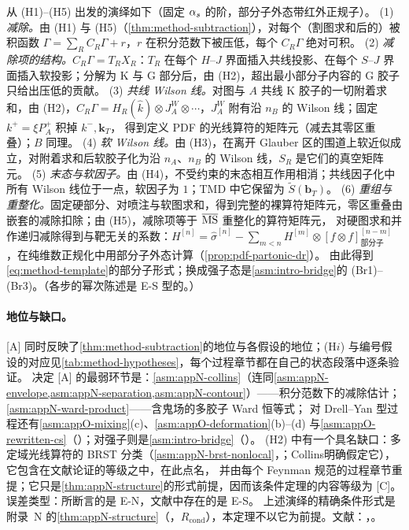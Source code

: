 \begin{proofsketch}
从 (H1)--(H5) 出发的演绎如下（固定 $\alpha_s$ 的阶，部分子外态带红外正规子）。
(1) \emph{减除。}由 (H1) 与 (H5)（\cref{thm:method-subtraction}），对每个（割图求和后的）被积函数 $\Gamma=\sum_RC_R\Gamma+r$，$r$ 在积分范数下被压低，每个 $C_R\Gamma$ 绝对可积。
(2) \emph{减除项的结构。}$C_R\Gamma=T_RX_R$：$T_R$ 在每个 $H$--$J$ 界面插入共线投影、在每个 $S$--$J$ 界面插入软投影；分解为 K 与 G 部分后，由 (H2)，超出最小部分子内容的 G 胶子只给出压低的贡献。
(3) \emph{共线 Wilson 线。}对图与 $A$ 共线 K 胶子的一切附着求和，由 (H2)，$C_R\Gamma=H_R(\hat k)\otimes J_A^W\otimes\cdots$，$J_A^W$ 附有沿 $n_B$ 的 Wilson 线；固定 $k^+=\xi P_A^+$ 积掉 $k^-,\mathbf k_T$，
得到定义 PDF 的光线算符的矩阵元（减去其零区重叠）；$B$ 同理。
(4) \emph{软 Wilson 线。}由 (H3)，在离开 Glauber 区的围道上软近似成立，对附着求和后软胶子化为沿 $n_A$、$n_B$ 的 Wilson 线，$S_R$ 是它们的真空矩阵元。
(5) \emph{末态与软因子。}由 (H4)，不受约束的末态相互作用相消；共线因子化中所有 Wilson 线位于一点，软因子为 $1$；TMD 中它保留为 $\tilde S(\mathbf b_T)$。
(6) \emph{重组与重整化。}固定硬部分、对喷注与软图求和，得到完整的裸算符矩阵元，零区重叠由嵌套的减除扣除；由 (H5)，减除项等于 $\overline{\rm MS}$ 重整化的算符矩阵元，
对硬图求和并作递归减除得到与靶无关的系数：$H^{[n]}=\hat\sigma^{[n]}-\sum_{m<n}H^{[m]}\otimes[f\otimes f]^{[n-m]}_{\text{部分子}}$，在纯维数正规化中用部分子外态计算（\cref{prop:pdf-partonic-dr}）。
由此得到\cref{eq:method-template}的部分子形式；换成强子态是\cref{asm:intro-bridge}的 (Br1)--(Br3)。（各步的幂次陈述是 E-S 型的。）
\end{proofsketch}

\paragraph{地位与缺口。}[A] 同时反映了\cref{thm:method-subtraction}的地位与各假设的地位；(H$i$) 与编号假设的对应见\cref{tab:method-hypotheses}，每个过程章节都在自己的状态段落中逐条验证。
决定 [A] 的最弱环节是：\cref{asm:appN-collins}（连同\cref{asm:appN-envelope,asm:appN-separation,asm:appN-contour}）——积分范数下的减除估计；\cref{asm:appN-ward-product}——含鬼场的多胶子 Ward 恒等式；
对 Drell--Yan 型过程还有\cref{asm:appO-mixing}(c)、\cref{asm:appO-deformation}(b)--(d) 与\cref{asm:appO-rewritten-cs}（\cite[第~14.4.8~节]{Collins2011}）；对强子则是\cref{asm:intro-bridge}（\tagC）。
(H2) 中有一个具名缺口：多定域光线算符的 BRST 分类（\cref{asm:appN-brst-nonlocal}，\tagC；Collins\cite[第~11.3.2~节]{Collins2011}明确假定它），它包含在文献论证的等级之中，在此点名，
并由每个 Feynman 规范的过程章节重提；它只是\cref{thm:appN-structure}的形式前提，因而该条件定理的内容等级为 [C]。误差类型：所断言的是 E-N，文献中存在的是 E-S。
上述演绎的精确条件形式是附录~N 的\cref{thm:appN-structure}（\tagR，$R_{\mathrm{cond}}$），本定理不以它为前提。文献：\cite{CollinsSoperSterman1989}，\cite[第~10、11、14~章]{Collins2011}。

